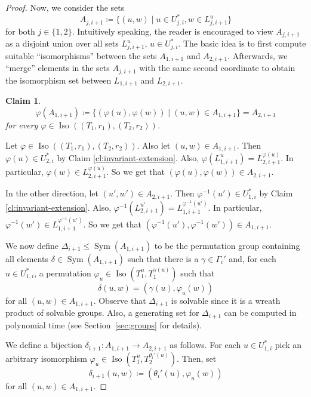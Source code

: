 \PassOptionsToPackage{dvipsnames,svgnames}{xcolor}\documentclass[10pt,a4paper]{article}
\newtheorem{claim}{Claim}[section]
\DeclareMathOperator{\Iso}{Iso}
\DeclareMathOperator{\Sym}{Sym}
\begin{document}
\begin{proof}
 Now, we consider the sets
 \[A_{j,i+1} \coloneqq \{(u,w) \mid u \in U_{j,i}^*, w \in L_{j,i+1}^{u}\}\]
 for both $j \in \{1,2\}$.
 Intuitively speaking, the reader is encouraged to view $A_{j,i+1}$ as a disjoint union over all sets $L_{j,i+1}^{u}$, $u \in U_{j,i}^*$.
 The basic idea is to first compute suitable ``isomorphisms'' between the sets $A_{1,i+1}$ and $A_{2,i+1}$.
 Afterwards, we ``merge'' elements in the sets $A_{j,i+1}$ with the same second coordinate to obtain the isomorphism set between $L_{1,i+1}$ and $L_{2,i+1}$.

 \begin{claim}
  \[\varphi(A_{1,i+1}) \coloneqq \{(\varphi(u),\varphi(w)) \mid (u,w) \in A_{1,i+1}\} = A_{2,i+1}\]
  for every $\varphi \in \Iso((T_1,r_1),(T_2,r_2))$.
 \end{claim}

 \begin{subproof}
  Let $\varphi \in \Iso((T_1,r_1),(T_2,r_2))$.
  Also let $(u,w) \in A_{1,i+1}$.
  Then $\varphi(u) \in U_{2,i}^*$ by Claim \ref{cl:invariant-extension}.
  Also, $\varphi(L_{1,i+1}^u) = L_{2,i+1}^{\varphi(u)}$.
  In particular, $\varphi(w) \in L_{2,i+1}^{\varphi(u)}$.
  So we get that $(\varphi(u),\varphi(w)) \in A_{2,i+1}$.

  In the other direction, let $(u',w') \in A_{2,i+1}$.
  Then $\varphi^{-1}(u') \in U_{1,i}^*$ by Claim \ref{cl:invariant-extension}.
  Also, $\varphi^{-1}(L_{2,i+1}^{u'}) = L_{1,i+1}^{\varphi^{-1}(u')}$.
  In particular, $\varphi^{-1}(w') \in L_{1,i+1}^{\varphi^{-1}(u')}$.
  So we get that $(\varphi^{-1}(u'),\varphi^{-1}(w')) \in A_{1,i+1}$.
 \end{subproof}

 We now define $\Delta_{i+1} \leq \Sym(A_{1,i+1})$ to be the permutation group containing all elements $\delta \in \Sym(A_{1,i+1})$ such that there is a $\gamma \in \Gamma_i'$ and, for each $u \in U_{1,i}^*$, a permutation $\varphi_u \in \Iso(T_1^u,T_1^{\gamma(u)})$ such that
 \[\delta(u,w) = (\gamma(u),\varphi_u(w))\]
 for all $(u,w) \in A_{1,i+1}$.
 Observe that $\Delta_{i+1}$ is solvable since it is a wreath product of solvable groups.
 Also, a generating set for $\Delta_{i+1}$ can be computed in polynomial time (see Section~\ref{sec:groups} for details).

 We define a bijection $\delta_{i+1}\colon A_{1,i+1} \to A_{2,i+1}$ as follows.
 For each $u \in U_{1,i}^*$ pick an arbitrary isomorphism $\varphi_u \in \Iso(T_1^u,T_2^{\theta_i'(u)})$.
 Then, set
 \[\delta_{i+1}(u,w) \coloneqq (\theta_i'(u),\varphi_u(w))\]
 for all $(u,w) \in A_{1,i+1}$.


\end{proof}
\end{document}
